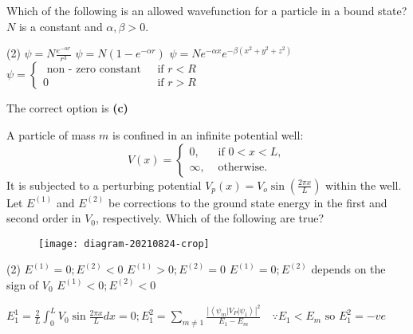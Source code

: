 \begin{enumerate}
	\begin{minipage}{\textwidth}
		\item Which of the following is an allowed wavefunction for a particle in a bound state? $N$ is a constant and $\alpha, \beta>0$.
	\end{minipage}
	\begin{tasks}(2)
		\task[\textbf{A.}] $\psi=N \frac{e^{-\alpha r}}{r^{3}}$ 
		\task[\textbf{B.}]$\psi=N\left(1-e^{-\alpha r}\right)$
		\task[\textbf{C.}]$\psi=N e^{-\alpha x} e^{-\beta\left(x^{2}+y^{2}+z^{2}\right)}$
		\task[\textbf{D.}]$\psi= \begin{cases}\text { non - zero constant } & \text { if } r<R \\ 0 & \text { if } r>R\end{cases}$
	\end{tasks}
	\begin{answer}
		The correct option is \textbf{(c)}	
	\end{answer}
	\begin{minipage}{\textwidth}
		\item A particle of mass $m$ is confined in an infinite potential well:
		$$
		V(x)= \begin{cases}0, & \text { if } 0<x<L, \\ \infty, & \text { otherwise. }\end{cases}
		$$
		It is subjected to a perturbing potential $V_{p}(x)=V_{o} \sin \left(\frac{2 \pi x}{L}\right)$ within the well. Let $E^{(1)}$ and $E^{(2)}$ be corrections to the ground state energy in the first and second order in $V_{0}$, respectively. Which of the following are true?
		\begin{figure}[H]
			\centering
			\texttt{[image: diagram-20210824-crop]}
		\end{figure}
	\end{minipage}
	\begin{tasks}(2)
		\task[\textbf{A.}] $E^{(1)}=0 ; E^{(2)}<0$
		\task[\textbf{B.}]$E^{(1)}>0 ; E^{(2)}=0$
		\task[\textbf{C.}]$E^{(1)}=0 ; E^{(2)}$ depends on the sign of $V_{0}$
		\task[\textbf{D.}]$E^{(1)}<0 ; E^{(2)}<0$
	\end{tasks}
	\begin{answer}
		$E_{1}^{1}=\frac{2}{L} \int_{0}^{L} V_{0} \sin \frac{2 \pi x}{L} d x=0 ; E_{1}^{2}=\sum_{m \neq 1} \frac{\left|\left\langle\psi_{m}\left|V_{P}\right| \psi_{1}\right\rangle\right|^{2}}{E_{1}-E_{m}} \quad \because E_{1}<E_{m} \text { so } E_{1}^{2}=-v e$\\

\end{answer}
\end{enumerate}
